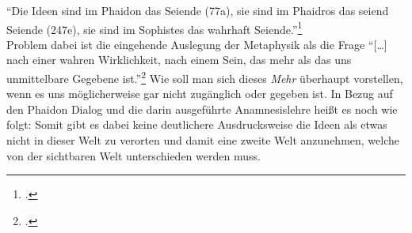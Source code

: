 \enquote{Die Ideen sind im Phaidon das Seiende (77a), sie sind im Phaidros das seiend Seiende (247e), sie sind im Sophistes das wahrhaft Seiende.}\footcite[vgl.][S. 131]{Martin73}\\
Problem dabei ist die eingehende Auslegung der Metaphysik als die Frage \enquote{[\dots] nach einer wahren Wirklichkeit, nach einem Sein, das mehr als das uns unmittelbare Gegebene ist.}\footcite[vgl.][S. 17]{DisseMetaphysik} Wie soll man sich dieses \emph{Mehr} überhaupt vorstellen, wenn es uns möglicherweise gar nicht zugänglich oder gegeben ist.
In Bezug auf den Phaidon Dialog und die darin ausgeführte Anamnesislehre heißt es noch wie folgt:
Somit gibt es dabei keine deutlichere Ausdrucksweise die Ideen als etwas nicht in dieser Welt zu verorten und damit eine zweite Welt anzunehmen, welche von der sichtbaren Welt unterschieden werden muss. 
